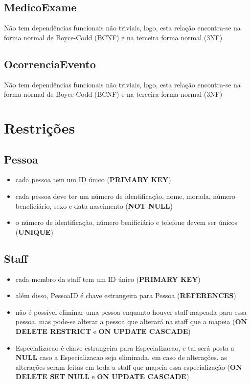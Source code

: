 \documentclass[article, a4paper, 12pt, oneside]{memoir}
\begin{document}
\section*{MedicoExame}
Não tem dependências funcionais não triviais, logo, esta relação encontra-se na forma normal de Boyce-Codd (BCNF) e na terceira forma normal (3NF)

\section*{OcorrenciaEvento}
Não tem dependências funcionais não triviais, logo, esta relação encontra-se na forma normal de Boyce-Codd (BCNF) e na terceira forma normal (3NF)

\newpage
\chapter[Restrições][Restrições]{Restrições} \label{\thechapter}

\section*{Pessoa}
\begin{itemize}
	\item cada pessoa tem um ID único (\textbf{PRIMARY KEY})
	\item cada pessoa deve ter um número de identificação, nome, morada, número beneficiário, sexo e data nascimento (\textbf{NOT NULL})
	\item o número de identificação, número benificiário e telefone devem ser únicos (\textbf{UNIQUE})
\end{itemize}

\section*{Staff}
\begin{itemize}
	\item cada membro da staff tem um ID único (\textbf{PRIMARY KEY})
	\item além disso, PessoaID é chave estrangeira para Pessoa (\textbf{REFERENCES})
	\item não é possível eliminar uma pessoa enquanto houver staff mapeada para essa pessoa, mas pode-se alterar a pessoa que alterará na staff que a mapeia (\textbf{ON DELETE RESTRICT} e \textbf{ON UPDATE CASCADE})
	\item Especializacao é chave estrangeira para Especializacao, e tal será posta a \textbf{NULL} caso a Especializacao seja eliminada, em caso de alterações, as alterações seram feitas em toda a staff que mapeia essa especialização (\textbf{ON DELETE SET NULL} e \textbf{ON UPDATE CASCADE})
\end{itemize}
\end{document}
